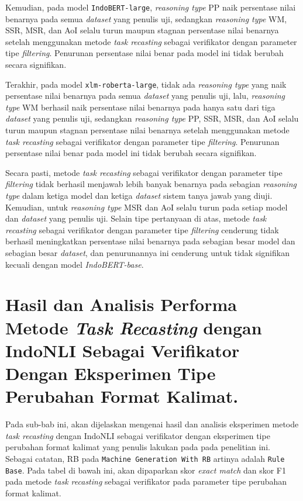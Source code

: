 Kemudian, pada model \texttt{IndoBERT-large}, \emph{reasoning type} PP naik persentase nilai benarnya pada semua \emph{dataset} yang penulis uji, sedangkan \emph{reasoning type} WM, SSR, MSR, dan AoI selalu turun maupun stagnan persentase nilai benarnya setelah menggunakan metode \emph{task recasting} sebagai verifikator dengan parameter tipe \emph{filtering}. Penurunan persentase nilai benar pada model ini tidak berubah secara signifikan.

Terakhir, pada model \texttt{xlm-roberta-large}, tidak ada \emph{reasoning type} yang naik persentase nilai benarnya pada semua \emph{dataset} yang penulis uji, lalu, \emph{reasoning type} WM berhasil naik persentase nilai benarnya pada hanya satu dari tiga \emph{dataset} yang penulis uji, sedangkan \emph{reasoning type} PP, SSR, MSR, dan AoI selalu turun maupun stagnan persentase nilai benarnya setelah menggunakan metode \emph{task recasting} sebagai verifikator dengan parameter tipe \emph{filtering}. Penurunan persentase nilai benar pada model ini tidak berubah secara signifikan.

Secara pasti, metode \emph{task recasting} sebagai verifikator dengan parameter tipe \emph{filtering} tidak berhasil menjawab lebih banyak benarnya pada sebagian \emph{reasoning type} dalam ketiga model dan ketiga \emph{dataset} sistem tanya jawab yang diuji. Kemudian, untuk \emph{reasoning type} MSR dan AoI selalu turun pada setiap model dan \emph{dataset} yang penulis uji. Selain tipe pertanyaan di atas, metode \emph{task recasting} sebagai verifikator dengan parameter tipe \emph{filtering} cenderung tidak berhasil meningkatkan persentase nilai benarnya pada sebagian besar model dan sebagian besar \emph{dataset}, dan penurunannya ini cenderung untuk tidak signifikan kecuali dengan model \emph{IndoBERT-base}.

\section{Hasil dan Analisis Performa Metode \emph{Task Recasting} dengan IndoNLI Sebagai Verifikator Dengan Eksperimen Tipe Perubahan Format Kalimat.}
\label{5.5}
Pada sub-bab ini, akan dijelaskan mengenai hasil dan analisis eksperimen metode \emph{task recasting} dengan IndoNLI sebagai verifikator dengan eksperimen tipe perubahan format kalimat yang penulis lakukan pada pada penelitian ini. Sebagai catatan, RB pada \texttt{Machine Generation With RB} artinya adalah \texttt{Rule Base}. Pada tabel di bawah ini, akan dipaparkan skor \emph{exact match} dan skor F1 pada metode \emph{task recasting} sebagai verifikator pada parameter tipe perubahan format kalimat.

